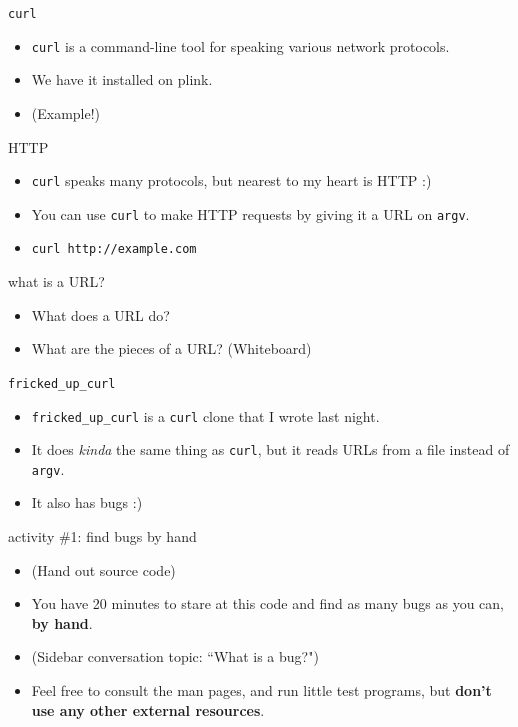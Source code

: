 \documentclass[hyphens,aspectratio=169,dvipsnames]{beamer}
\begin{document}
\begin{frame}[fragile]{\texttt{curl}}
    \begin{itemize}
        \pause \item \texttt{curl} is a command-line tool for speaking various network protocols.
        \pause \item We have it installed on plink.
        \pause \item (Example!)
    \end{itemize}
\end{frame}

\begin{frame}[fragile]{HTTP}
    \begin{itemize}
        \pause \item \texttt{curl} speaks many protocols, but nearest to my heart is HTTP :)
        \pause \item You can use \texttt{curl} to make HTTP requests by giving it a URL on \texttt{argv}.
        \pause \item \texttt{curl http://example.com}
    \end{itemize}
\end{frame}

\begin{frame}[fragile]{what is a URL?}
    \begin{itemize}
        \pause \item What does a URL do?
        \pause \item What are the pieces of a URL? (Whiteboard)
    \end{itemize}
\end{frame}

\begin{frame}[fragile]{\texttt{fricked\_up\_curl}}
    \begin{itemize}
        \pause \item \texttt{fricked\_up\_curl} is a \texttt{curl} clone that I wrote last night.
        \pause \item It does \textit{kinda} the same thing as \texttt{curl}, but it reads URLs from a file instead of \texttt{argv}.
        \pause \item It also has bugs :)
    \end{itemize}
\end{frame}

\begin{frame}[fragile]{activity \#1: find bugs by hand}
    \begin{itemize}
        \pause \item (Hand out source code)
        \pause \item You have 20 minutes to stare at this code and find as many bugs as you can, \textbf{by hand}.
        \pause \item (Sidebar conversation topic: ``What is a bug?")
        \pause \item Feel free to consult the man pages, and run little test programs, but \textbf{don't use any other external resources}.
    \end{itemize}
\end{frame}
\end{document}
